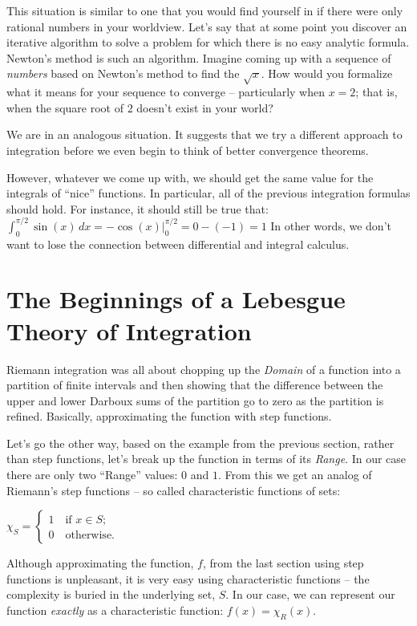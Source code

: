 \documentclass{article}
\begin{document}
This situation is similar to one that you would find yourself in if there were 
only rational numbers in your worldview. Let's say that at some point 
you discover an iterative 
algorithm to solve a problem for which there is no easy analytic formula. 
Newton's method is such an algorithm. Imagine coming up with a sequence of {\em numbers\/}
based on Newton's method to find the $\sqrt{x}$. How would you formalize what 
it means for your sequence to converge -- particularly when $x = 2$; that is, when the
square root of $2$ doesn't exist in your world?

We are in an analogous situation. It suggests that 
we try a different approach to integration before we even
begin to think of better convergence theorems. 

However, whatever we come up with, we should get the same value for the 
integrals of ``nice'' functions. In particular, all of the previous integration 
formulas should hold. For instance, it should still be true that: 
$\int_0^{\pi / 2} \sin(x) \, dx = -\cos(x)|_{0}^{\pi / 2} = 0 - (-1) = 1$
In other words, we don't want to lose the connection between differential and
integral calculus.


\section{The Beginnings of a Lebesgue Theory of Integration}

Riemann integration was all about chopping up the {\em Domain\/} of a function 
into a partition of finite intervals and then showing that the difference 
between the upper and lower Darboux sums of the partition 
go to zero as the partition is refined. Basically, approximating the function 
with step functions.

Let's go the other way, based on the example from the previous section, rather 
than step functions, let's break up the function in terms of its {\em Range\/}. 
In our case there are only two ``Range'' values: $0$ and $1$. From this we get an 
analog of Riemann's step functions -- 
so called characteristic functions of sets:

$\chi_{S} = \begin{cases} 1 \quad \text{if $x \in  S$;} \\ 0 \quad \text{otherwise.} \end{cases}$

Although approximating the function, $f$, from the last section using step 
functions is unpleasant, it is very easy using characteristic functions -- the complexity 
is buried in the underlying set, $S$. In our case, we can represent our function {\em exactly\/}
as a characteristic function: $f(x) = \chi_{R}(x)$.
\end{document}
